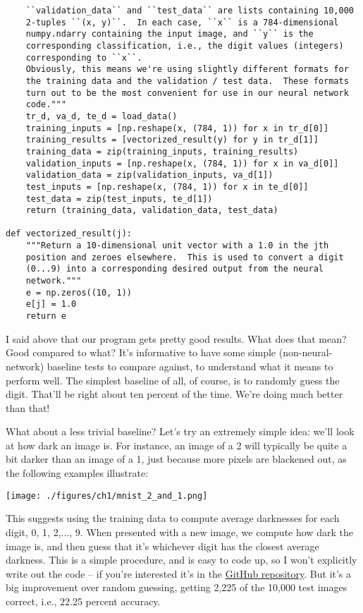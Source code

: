 \documentclass[a4paper,twoside,10pt]{book}
\begin{document}
\begin{lstlisting}
	``validation_data`` and ``test_data`` are lists containing 10,000
	2-tuples ``(x, y)``.  In each case, ``x`` is a 784-dimensional
	numpy.ndarry containing the input image, and ``y`` is the
	corresponding classification, i.e., the digit values (integers)
	corresponding to ``x``.
	Obviously, this means we're using slightly different formats for
	the training data and the validation / test data.  These formats
	turn out to be the most convenient for use in our neural network
	code."""
	tr_d, va_d, te_d = load_data()
	training_inputs = [np.reshape(x, (784, 1)) for x in tr_d[0]]
	training_results = [vectorized_result(y) for y in tr_d[1]]
	training_data = zip(training_inputs, training_results)
	validation_inputs = [np.reshape(x, (784, 1)) for x in va_d[0]]
	validation_data = zip(validation_inputs, va_d[1])
	test_inputs = [np.reshape(x, (784, 1)) for x in te_d[0]]
	test_data = zip(test_inputs, te_d[1])
	return (training_data, validation_data, test_data)

def vectorized_result(j):
	"""Return a 10-dimensional unit vector with a 1.0 in the jth
	position and zeroes elsewhere.  This is used to convert a digit
	(0...9) into a corresponding desired output from the neural
	network."""
	e = np.zeros((10, 1))
	e[j] = 1.0
	return e
\end{lstlisting}
I said above that our program gets pretty good results. What does that mean? Good compared to what? It's informative to have some simple (non-neural-network) baseline tests to compare against, to understand what it means to perform well. The simplest baseline of all, of course, is to randomly guess the digit. That'll be right about ten percent of the time. We're doing much better than that!

What about a less trivial baseline? Let's try an extremely simple idea: we'll look at how dark an image is. For instance, an image of a 2 will typically be quite a bit darker than an image of a 1, just because more pixels are blackened out, as the following examples illustrate:

\begin{center}
	\texttt{[image: ./figures/ch1/mnist\_2\_and\_1.png]}
\end{center}
This suggests using the training data to compute average darknesses for each digit, 0, 1, 2,$\ldots$, 9. When presented with a new image, we compute how dark the image is, and then guess that it's whichever digit has the closest average darkness. This is a simple procedure, and is easy to code up, so I won't explicitly write out the code -- if you're interested it's in the \href{https://github.com/mnielsen/neural-networks-and-deep-learning/blob/master/src/mnist_average_darkness.py}{GitHub repository}. But it's a big improvement over random guessing, getting 2,225 of the 10,000 test images correct, i.e., 22.25 percent accuracy.
\end{document}
